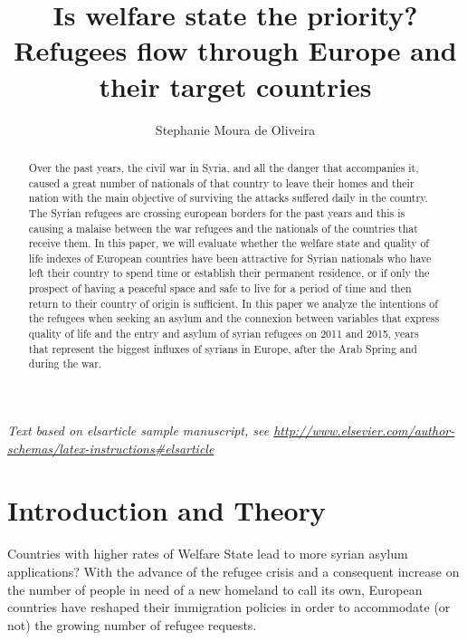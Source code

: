 \documentclass[]{elsarticle} %
\begin{document}
\begin{frontmatter}

  \title{Is welfare state the priority? Refugees flow through Europe and their
target countries}
    \author[Universidade Federal de Pernambuco - UFPE]{Stephanie Moura de Oliveira}
      \address[Universidade Federal de Pernambuco - UFPE]{Av. Prof.~Moraes Rego, 1235 - Cidade Universitária, Recife - PE,
50670-901}
  
  \begin{abstract}
  Over the past years, the civil war in Syria, and all the danger that
  accompanies it, caused a great number of nationals of that country to
  leave their homes and their nation with the main objective of surviving
  the attacks suffered daily in the country. The Syrian refugees are
  crossing european borders for the past years and this is causing a
  malaise between the war refugees and the nationals of the countries that
  receive them. In this paper, we will evaluate whether the welfare state
  and quality of life indexes of European countries have been attractive
  for Syrian nationals who have left their country to spend time or
  establish their permanent residence, or if only the prospect of having a
  peaceful space and safe to live for a period of time and then return to
  their country of origin is sufficient. In this paper we analyze the
  intentions of the refugees when seeking an asylum and the connexion
  between variables that express quality of life and the entry and asylum
  of syrian refugees on 2011 and 2015, years that represent the biggest
  influxes of syrians in Europe, after the Arab Spring and during the war.
  \end{abstract}
  
 \end{frontmatter}

\emph{Text based on elsarticle sample manuscript, see
\url{http://www.elsevier.com/author-schemas/latex-instructions\#elsarticle}}

\section{Introduction and Theory}\label{introduction-and-theory}

Countries with higher rates of Welfare State lead to more syrian asylum
applications? With the advance of the refugee crisis and a consequent
increase on the number of people in need of a new homeland to call its
own, European countries have reshaped their immigration policies in
order to accommodate (or not) the growing number of refugee requests.
\end{document}
